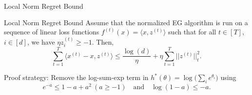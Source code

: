 \begin{frame}{Local Norm Regret Bound}
    \scriptsize
    \begin{block}{Local Norm Regret Bound}
    Assume that the normalized EG algorithm is run on a sequence of linear loss functions $f^{(t)}(x) = \langle x, z^{(t)} \rangle$ such that for all $t \in [T]$, $i \in [d]$, we have $\eta z^{(t)}_i \geq -1$. Then,
    $$
    \sum_{t=1}^T \langle x^{(t)} - x, z^{(t)} \rangle
    \leq \frac{\log(d)}{\eta} + \eta \sum_{t=1}^T ||z^{(t)}||^2_t.
    $$
    \end{block}
    Proof strategy: Remove the log-sum-exp term in $h^*(\theta) = \log\big(\sum_i e^{\theta_i}\big)$ using
    $$ e^{-a} \leq 1 - a + a^2 \ (a \geq -1) \quad \text{and} \quad \log(1-a) \leq -a. $$
\end{frame}

